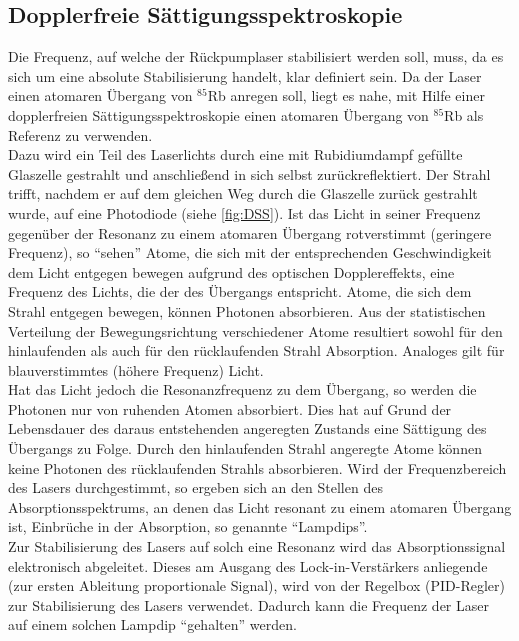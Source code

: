\documentclass[
class=book,
accentcolor=1b,
custommargins=geometry,
fontsize=11pt,
thesis={type=Versuchsanleitung},
ruledheaders=all,
headline=false,
instbox=false,
marginpar=false,
title=small,
ignore-missing-data=true,
twoside=false,
pdfa=false %
]{apqpub}
\begin{document}
				\newpage
				
				\subsection{Dopplerfreie Sättigungsspektroskopie}
				
				Die Frequenz, auf welche der Rückpumplaser stabilisiert werden soll, muss, da es sich um eine absolute Stabilisierung handelt, klar definiert sein. Da der Laser einen atomaren Übergang von $^{85}$Rb anregen soll, liegt es nahe, mit Hilfe einer dopplerfreien Sättigungsspektroskopie einen atomaren Übergang von $^{85}$Rb als Referenz zu verwenden.\\
				Dazu wird ein Teil des Laserlichts durch eine mit Rubidiumdampf gefüllte Glaszelle gestrahlt und anschließend in sich selbst zurückreflektiert. Der Strahl trifft, nachdem er auf dem gleichen Weg durch die Glaszelle zurück gestrahlt wurde, auf eine Photodiode (siehe \autoref{fig:DSS}). Ist das Licht in seiner Frequenz gegenüber der Resonanz zu einem atomaren Übergang rotverstimmt (geringere Frequenz), so ``sehen'' Atome, die sich mit der entsprechenden Geschwindigkeit dem Licht entgegen bewegen aufgrund des optischen Dopplereffekts, eine Frequenz des Lichts, die
				der des Übergangs entspricht. Atome, die sich dem Strahl entgegen bewegen, können Photonen absorbieren. Aus der statistischen Verteilung der Bewegungsrichtung verschiedener Atome resultiert sowohl für den hinlaufenden als auch für den rücklaufenden Strahl Absorption. Analoges gilt für blauverstimmtes (höhere Frequenz) Licht.\\
				Hat das Licht jedoch die Resonanzfrequenz zu dem Übergang, so werden die Photonen nur von ruhenden Atomen absorbiert. Dies hat auf Grund der Lebensdauer des daraus entstehenden angeregten Zustands eine Sättigung des Übergangs zu Folge. Durch den hinlaufenden Strahl angeregte Atome können keine Photonen des rücklaufenden Strahls absorbieren. Wird der Frequenzbereich des Lasers durchgestimmt, so ergeben sich an den Stellen des Absorptionsspektrums, an denen das Licht resonant zu einem atomaren Übergang ist, Einbrüche in der Absorption, so genannte ``Lampdips''.\\
				Zur Stabilisierung des Lasers auf solch eine Resonanz wird das Absorptionssignal elektronisch abgeleitet. Dieses am Ausgang des Lock-in-Verstärkers anliegende (zur ersten Ableitung proportionale Signal), wird von der Regelbox (PID-Regler) zur Stabilisierung des Lasers verwendet. Dadurch kann die Frequenz der Laser auf einem solchen Lampdip ``gehalten'' werden.\\
				
\end{document}
